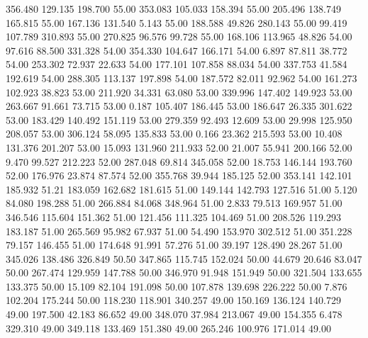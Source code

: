  356.480  129.135  198.700        55.00
 353.083  105.033  158.394        55.00
 205.496  138.749  165.815        55.00
 167.136  131.540    5.143        55.00
 188.588   49.826  280.143        55.00
  99.419  107.789  310.893        55.00
 270.825   96.576   99.728        55.00
 168.106  113.965   48.826        54.00
  97.616   88.500  331.328        54.00
 354.330  104.647  166.171        54.00
   6.897   87.811   38.772        54.00
 253.302   72.937   22.633        54.00
 177.101  107.858   88.034        54.00
 337.753   41.584  192.619        54.00
 288.305  113.137  197.898        54.00
 187.572   82.011   92.962        54.00
 161.273  102.923   38.823        53.00
 211.920   34.331   63.080        53.00
 339.996  147.402  149.923        53.00
 263.667   91.661   73.715        53.00
   0.187  105.407  186.445        53.00
 186.647   26.335  301.622        53.00
 183.429  140.492  151.119        53.00
 279.359   92.493   12.609        53.00
  29.998  125.950  208.057        53.00
 306.124   58.095  135.833        53.00
   0.166   23.362  215.593        53.00
  10.408  131.376  201.207        53.00
  15.093  131.960  211.933        52.00
  21.007   55.941  200.166        52.00
   9.470   99.527  212.223        52.00
 287.048   69.814  345.058        52.00
  18.753  146.144  193.760        52.00
 176.976   23.874   87.574        52.00
 355.768   39.944  185.125        52.00
 353.141  142.101  185.932        51.21
 183.059  162.682  181.615        51.00
 149.144  142.793  127.516        51.00
   5.120   84.080  198.288        51.00
 266.884   84.068  348.964        51.00
   2.833   79.513  169.957        51.00
 346.546  115.604  151.362        51.00
 121.456  111.325  104.469        51.00
 208.526  119.293  183.187        51.00
 265.569   95.982   67.937        51.00
  54.490  153.970  302.512        51.00
 351.228   79.157  146.455        51.00
 174.648   91.991   57.276        51.00
  39.197  128.490   28.267        51.00
 345.026  138.486  326.849        50.50
 347.865  115.745  152.024        50.00
  44.679   20.646   83.047        50.00
 267.474  129.959  147.788        50.00
 346.970   91.948  151.949        50.00
 321.504  133.655  133.375        50.00
  15.109   82.104  191.098        50.00
 107.878  139.698  226.222        50.00
   7.876  102.204  175.244        50.00
 118.230  118.901  340.257        49.00
 150.169  136.124  140.729        49.00
 197.500   42.183   86.652        49.00
 348.070   37.984  213.067        49.00
 154.355    6.478  329.310        49.00
 349.118  133.469  151.380        49.00
 265.246  100.976  171.014        49.00
